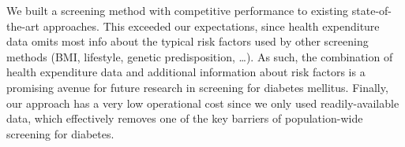 We built a screening method with competitive performance to existing state-of-the-art approaches. This exceeded our expectations, since health expenditure data omits most info about the typical risk factors used by other screening methods (BMI, lifestyle, genetic predisposition, \ldots). As such, the combination of health expenditure data and additional information about risk factors is a promising avenue for future research in screening for diabetes mellitus. Finally, our approach has a very low operational cost since we only used readily-available data, which effectively removes one of the key barriers of population-wide screening for diabetes.

\cleardoublepage

